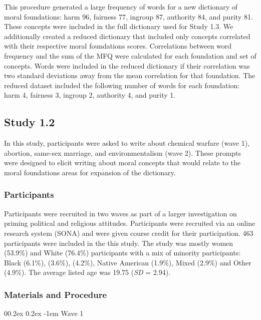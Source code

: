 \documentclass[
  man,floatsintext]{apa6}
\makeatletter
\let\oldparagraph\paragraph
\renewcommand{\paragraph}{
    \@ifstar
      \xxxParagraphStar
      \xxxParagraphNoStar
  }
\newcommand{\xxxParagraphStar}[1]{\oldparagraph*{#1}\mbox{}}
\newcommand{\xxxParagraphNoStar}[1]{\oldparagraph{#1}\mbox{}}
\renewcommand{\paragraph}{\@startsection{paragraph}{4}{\parindent}%
  {0\baselineskip \@plus 0.2ex \@minus 0.2ex}%
  {-1em}%
  {\normalfont\normalsize\bfseries\itshape\typesectitle}}
\makeatother
\begin{document}
This procedure generated a large frequency of words for a new dictionary
of moral foundations: harm 96, fairness
77, ingroup 87, authority
84, and purity 81. These
concepts were included in the full dictionary used for Study 1.3. We
additionally created a reduced dictionary that included only concepts
correlated with their respective moral foundations scores. Correlations
between word frequency and the sum of the MFQ were calculated for each
foundation and set of concepts. Words were included in the reduced
dictionary if their correlation was two standard deviations away from
the mean correlation for that foundation. The reduced dataset included
the following number of words for each foundation: harm
4, fairness 3,
ingroup 2, authority
4, and purity
1.

\subsection{Study 1.2}\label{study-1.2}

In this study, participants were asked to write about chemical warfare
(wave 1), abortion, same-sex marriage, and environmentalism (wave 2).
These prompts were designed to elicit writing about moral concepts that
would relate to the moral foundations areas for expansion of the
dictionary.

\subsubsection{Participants}\label{participants-1}

Participants were recruited in two waves as part of a larger
investigation on priming political and religious attitudes. Participants
were recruited via an online research system (SONA) and were given
course credit for their participation. 463
participants were included in the this study. The study was mostly women
(53.9\%) and White
(76.4\%) participants with a mix of
minority participants: Black (6.1\%),
(3.6\%),
(4.2\%), Native American
(1.9\%), Mixed
(2.9\%) and Other
(4.9\%). The average listed age was
19.75 (\emph{SD} =
2.94).

\subsubsection{Materials and Procedure}\label{materials-and-procedure-1}

\paragraph{Wave 1}\label{wave-1}
\end{document}
